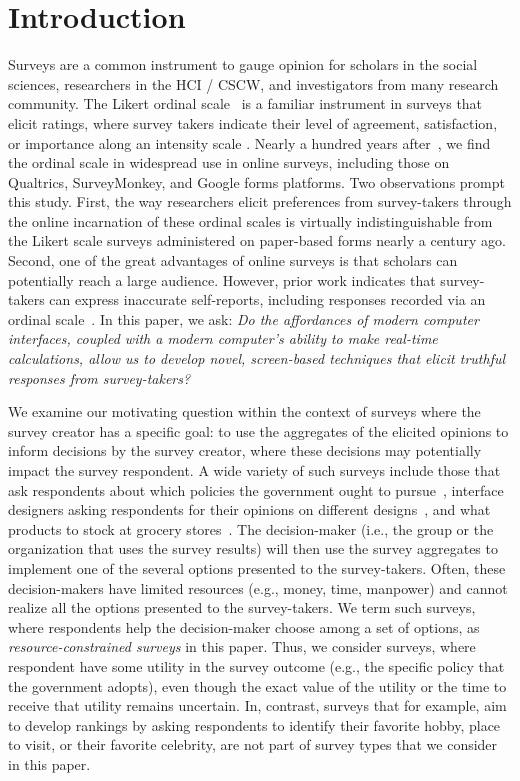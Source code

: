 \section{Introduction}

Surveys are a common instrument to gauge opinion for scholars in the social sciences, researchers in the HCI / CSCW, and investigators from many research community. The Likert ordinal scale~\cite{likert1932technique} is a familiar instrument in surveys that elicit ratings, where survey takers indicate their level of agreement, satisfaction, or importance along an intensity scale \cite{moors2016two}. Nearly a hundred years after~\textcite{likert1932technique}, we find the ordinal scale in widespread use in online surveys, including those on Qualtrics, SurveyMonkey, and Google forms platforms. Two observations prompt this study. First, the way researchers elicit preferences from survey-takers through the online incarnation of these ordinal scales is virtually indistinguishable from the Likert scale surveys administered on paper-based forms nearly a century ago. Second, one of the great advantages of online surveys is that scholars can potentially reach a large audience. However, prior work indicates that survey-takers can express inaccurate self-reports, including responses recorded via an ordinal scale~\cite{araujo2017much, vavreck2007exaggerated}. In this paper, we ask: \textit{Do the affordances of modern computer interfaces, coupled with a modern computer's ability to make real-time calculations, allow us to develop novel, screen-based techniques that elicit truthful responses from survey-takers?}

We examine our motivating question within the context of surveys where the survey creator has a specific goal: to use the aggregates of the elicited opinions to inform decisions by the survey creator, where these decisions may potentially impact the survey respondent. A wide variety of such surveys include those that ask respondents about which policies the government ought to pursue~\cite{pew_spending}, interface designers asking respondents for their opinions on different designs~\cite{ledo2018evaluation}, and what products to stock at grocery stores~\cite{nielsen}. The decision-maker (i.e., the group or the organization that uses the survey results) will then use the survey aggregates to implement one of the several options presented to the survey-takers. Often, these decision-makers have limited resources (e.g., money, time, manpower) and cannot realize all the options presented to the survey-takers. We term such surveys, where respondents help the decision-maker choose among a set of options, as \textit{resource-constrained surveys} in this paper. Thus, we consider surveys, where respondent have some utility in the survey outcome (e.g., the specific policy that the government adopts), even though the exact value of the utility or the time to receive that utility remains uncertain. In, contrast, surveys that for example, aim to develop rankings by asking respondents to identify their favorite hobby, place to visit, or their favorite celebrity, are not part of survey types that we consider in this paper. 


